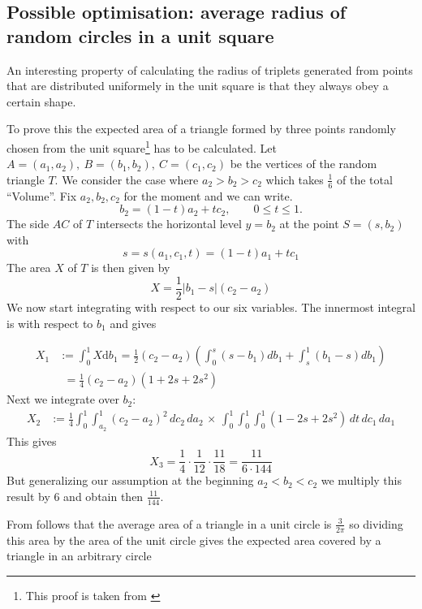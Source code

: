 \documentclass[11pt,twoside]{scrreprt}
\begin{document}

\subsection{Possible optimisation: average radius of random circles in a unit square} %
\label{ssub:average_radius_of_random_circles_in_a_unit_square}
An interesting property of calculating the radius of triplets generated from points that are distributed uniformely in the unit square is 
that they always obey a certain shape.

To prove this the expected area of a triangle formed by three points randomly chosen from the unit square\footnote{This proof is taken
from \cite{Blatter:2015}} has to be calculated. Let \( A = (a_1, a_2),\ B = (b_1, b_2),\ C = (c_1, c_2)\) be the vertices of the random triangle \( T \). We consider the case where \( a_2
> b_2 > c_2 \) which takes $\frac{1}{6}$ of the total ``Volume''. Fix \( a_2, b_2, c_2 \) for the moment and we can write.
\[
  b_2 = (1-t)a_2 + tc_2, \qquad 0 \leq t \leq 1.
\]
The side $AC$ of $T$ intersects the horizontal level $y=b_2$ at the point $S=(s,b_2)$ with
\begin{equation}
  s = s(a_1,c_1,t) = (1-t)a_1 + tc_1
\end{equation}
The area $X$ of $T$ is then given by
\[
  X = \frac{1}{2}\lvert b_1 - s\rvert(c_2 - a_2)
\]
We now start integrating with respect to our six variables. The innermost integral is with respect to $b_1$ and gives

\begin{align}
  X_1 &:= \int_0^1X\text{d}b_1=\frac{1}{2}(c_2-a_2)\left( \int_0^s(s-b_1)db_1 + \int_s^1(b_1-s)db_1\right)\nonumber\\
      &\phantom{:}= \frac{1}{4}(c_2-a_2)(1+2s+2s^2)\nonumber
\end{align}
Next we integrate over $b_2$:
\begin{align}
  X_2 &:= \frac{1}{4}\int_0^1\int_{a_2}^1(c_2-a_2)^2\,dc_2\,da_2\,\times\,\int_0^1\int_0^1\int_0^1(1-2s+2s^2)\,dt\,dc_1\,da_1  \nonumber
\end{align}
This gives
\[
  X_3 = \frac{1}{4}\cdot \frac{1}{12} \cdot \frac{11}{18} = \frac{11}{6\cdot144}
\]
But generalizing our assumption at the beginning $a_2 < b_2 < c_2$ we multiply this result by $6$ and obtain then $\frac{11}{144}$.

From \cite{Weisstein2016} follows that the average area of a triangle in a unit circle is $\frac{3}{2\pi}$ so dividing this area by the
area of the unit circle gives the expected area covered by a triangle in an arbitrary circle
\end{document}
